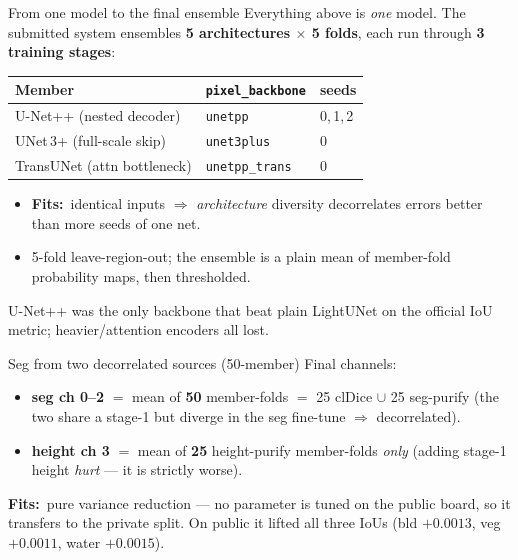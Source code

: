 \documentclass[aspectratio=169,11pt]{beamer}
\newcommand{\fit}{\textcolor{cHead}{\textbf{Fits:}}\ }
\newcommand{\code}[1]{\texttt{\small #1}}
\begin{document}
\begin{frame}{From one model to the final ensemble}
  Everything above is \emph{one} model. The submitted system ensembles
  \textbf{5 architectures $\times$ 5 folds}, each run through \textbf{3 training
  stages}:
  \begin{center}\small
  \begin{tabular}{lll}
    \toprule
    Member & \code{pixel\_backbone} & seeds\\
    \midrule
    U-Net++ (nested decoder) & \code{unetpp} & 0,\,1,\,2\\
    UNet\,3+ (full-scale skip) & \code{unet3plus} & 0\\
    TransUNet (attn bottleneck) & \code{unetpp\_trans} & 0\\
    \bottomrule
  \end{tabular}
  \end{center}
  \begin{itemize}\small
    \item \fit identical inputs $\Rightarrow$ \emph{architecture} diversity
      decorrelates errors better than more seeds of one net.
    \item 5-fold leave-region-out; the ensemble is a plain mean of member-fold
      probability maps, then thresholded.
  \end{itemize}
  {\footnotesize U-Net++ was the only backbone that beat plain LightUNet on the
   official IoU metric; heavier/attention encoders all lost.}
\end{frame}

\begin{frame}{Seg from two decorrelated sources (50-member)}
  Final channels:
  \begin{itemize}\small
    \item \textbf{seg ch 0--2} $=$ mean of \textbf{50} member-folds
      $=$ 25 clDice $\cup$ 25 seg-purify (the two share a stage-1 but diverge in
      the seg fine-tune $\Rightarrow$ decorrelated).
    \item \textbf{height ch 3} $=$ mean of \textbf{25} height-purify member-folds
      \emph{only} (adding stage-1 height \emph{hurt} --- it is strictly worse).
  \end{itemize}
  \vspace{0.3em}
  \fit pure variance reduction --- no parameter is tuned on the public board, so
  it transfers to the private split. On public it lifted all three IoUs
  (bld $+0.0013$, veg $+0.0011$, water $+0.0015$).
\end{frame}
\end{document}
